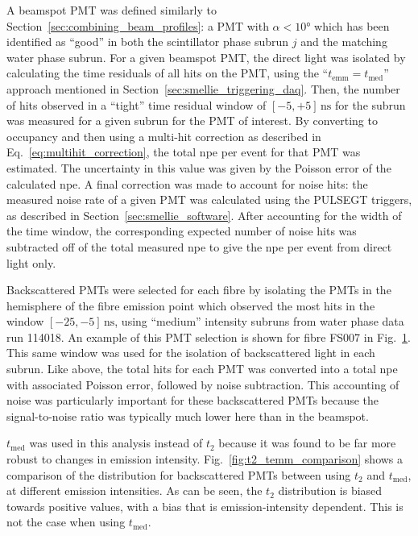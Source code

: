 A beamspot PMT was defined similarly to Section~\ref{sec:combining_beam_profiles}: a PMT with $\alpha<\ang{10}$ which has been identified as ``good'' in both the scintillator phase subrun $j$ and the matching water phase subrun. %
For a given beamspot PMT, the direct light was isolated by calculating the time residuals of all hits on the PMT, using the ``$t_{\mathrm{emm}} = t_{\mathrm{med}}$'' approach mentioned in Section~\ref{sec:smellie_triggering_daq}. %
Then, the number of hits observed in a ``tight'' time residual window of $[-5,+5]\,\si{\ns}$ for the subrun was measured for a given subrun for the PMT of interest. %
By converting to occupancy and then using a multi-hit correction as described in Eq.~\ref{eq:multihit_correction}, the total npe per event for that PMT was estimated. The uncertainty in this value was given by the Poisson error of the calculated npe. A final correction was made to account for noise hits: the measured noise rate of a given PMT was calculated using the PULSEGT triggers, as described in Section~\ref{sec:smellie_software}. After accounting for the width of the time window, the corresponding expected number of noise hits was subtracted off of the total measured npe to give the npe per event from direct light only.

Backscattered PMTs were selected for each fibre by isolating the PMTs in the hemisphere of the fibre emission point which observed the most hits in the \tres{} window $[-25,-5]\,\si{\ns}$, using ``medium'' intensity subruns from water phase data run \num{114018}. %
An example of this PMT selection is shown for fibre FS007 in Fig.~\ref{fig:smellie_backscat_PMT_selection}. This same \tres{} window was used for the isolation of backscattered light in each subrun. Like above, the total hits for each PMT was converted into a total npe with associated Poisson error, followed by noise subtraction. This accounting of noise was particularly important for these backscattered PMTs because the signal-to-noise ratio was typically much lower here than in the beamspot.

\begin{figure}
    \centering
    \caption[]{}
    \label{fig:smellie_backscat_PMT_selection}
\end{figure}

$t_{\mathrm{med}}$ was used in this analysis instead of $t_{2}$ because it was found to be far more robust to changes in emission intensity. Fig.~\ref{fig:t2_temm_comparison} shows a comparison of the \tres{} distribution for backscattered PMTs between using $t_{2}$ and $t_{\mathrm{med}}$, at different emission intensities. As can be seen, the $t_{2}$ distribution is biased towards positive \tres{} values, with a bias that is emission-intensity dependent. This is not the case when using $t_{\mathrm{med}}$. 

